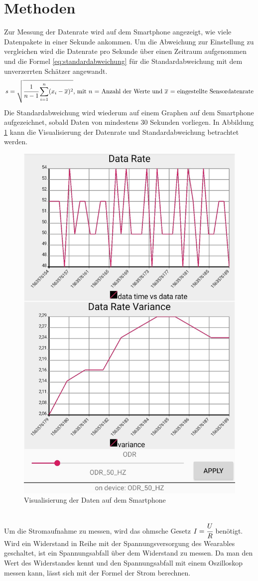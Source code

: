 \section{Methoden}
Zur Messung der Datenrate wird auf dem Smartphone angezeigt, wie viele Datenpakete in einer Sekunde ankommen.
Um die Abweichung zur Einstellung zu vergleichen wird die Datenrate pro Sekunde über einen Zeitraum aufgenommen und die Formel \ref{eq:standardabweichung} für die Standardabweichung mit dem unverzerrten Schätzer angewandt.
\begin{equation}
  \label{eq:standardabweichung}
	s = \sqrt{\cfrac{1}{n-1}\sum_{i=1}^{n} (x_{i}-\overline{x})^{2}}\text{, mit $n$ = Anzahl der Werte und $\overline{x}$ = eingestellte Sensordatenrate}
\end{equation}
Die Standardabweichung wird wiederum auf einem Graphen auf dem Smartphone aufgezeichnet, sobald Daten von mindestens 30 Sekunden vorliegen.
In Abbildung \ref{fig:android} kann die Visualisierung der Datenrate und Standardabweichung betrachtet werden.
\begin{figure}[hbtp]
	\centering
	\includegraphics[height=0.7\linewidth,angle=90]{res/android.jpg}
	\caption{Visualisierung der Daten auf dem Smartphone}
	\label{fig:android}
\end{figure}\\
Um die Stromaufnahme zu messen, wird das ohmsche Gesetz $I = \cfrac{U}{R}$ benötigt.
Wird ein Widerstand in Reihe mit der Spannungsversorgung des Wearables geschaltet, ist ein Spannungsabfall über dem Widerstand zu messen.
Da man den Wert des Widerstandes kennt und den Spannungsabfall mit einem Oszilloskop messen kann, lässt sich mit der Formel der Strom berechnen.
